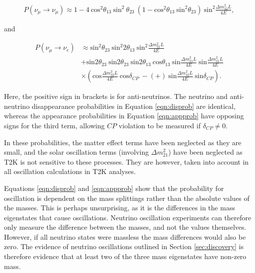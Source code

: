 \begin{equation}
\begin{aligned}
P(\nu_\mu \rightarrow \nu_\mu) \approx 1 - 4 \: \text{cos}^2\theta_{13} \: \text{sin}^2 \: \theta_{23} \: (1 - \text{cos}^2\theta_{13} \: \text{sin}^2\theta_{23}) \: \text{sin}^2\frac{\Delta m_{32}^2 L}{4E},
\end{aligned}
\label{eqn:disprob}
\end{equation}

and

\begin{equation}
\begin{aligned}
P(\nu_\mu \rightarrow \nu_e) &\approx \text{sin}^2\theta_{23} \: \text{sin}^2 2\theta_{13} \: \text{sin}^2 \frac{\Delta m_{31}^2 L}{4E}\\
&+\text{sin}2\theta_{23} \: \text{sin}2\theta_{23} \: \text{sin}2\theta_{13} \: \text{cos}\theta_{13} \: \text{sin}\frac{\Delta m_{21}^2 L}{4E} \: \text{sin}\frac{\Delta m_{31}^2 L}{4E}\\
&\times (\text{cos} \frac{\Delta m_{32}^2 L}{4E} \: \text{cos}\delta_{CP} \: - (+) \: \text{sin} \frac{\Delta m_{32}^2 L}{4E} \: \text{sin} \delta_{CP}).
\end{aligned}
\label{eqn:appprob}
\end{equation}

Here, the positive sign in brackets is for anti-neutrinos. The neutrino and anti-neutrino disappearance probabilities in Equation \eqref{eqn:disprob} are identical, whereas the appearance probabilities in Equation \eqref{eqn:appprob} have opposing signs for the third term, allowing $CP$ violation to be measured if $\delta_{CP} \neq 0$.

In these probabilities, the matter effect terms have been neglected as they are small, and the solar oscillation terms (involving $\Delta m_{21}^2$) have been neglected as T2K is not sensitive to these processes. They are however, taken into account in all oscillation calculations in T2K analyses.

Equations \ref{eqn:disprob} and \ref{eqn:appprob} show that the probability for oscillation is dependent on the mass splittings rather than the absolute values of the masses. This is perhaps unsurprising, as it is the differences in the mass eigenstates that cause oscillations.  Neutrino oscillation experiments can therefore only measure the difference between the masses, and not the values themselves. However, if all neutrino states were massless the mass differences would also be zero. The evidence of neutrino oscillations outlined in Section \ref{sec:discovery} is therefore evidence that at least two of the three mass eigenstates have non-zero mass. 

